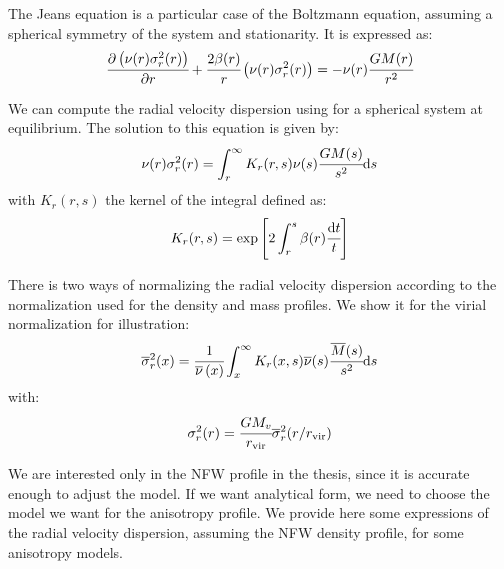 The Jeans equation is a particular case of the Boltzmann equation, assuming a
spherical symmetry of the system and stationarity. It is expressed as:
%
\begin{equation}
    \label{eq:jeans}
    \cfrac{{\partial} \left(\nu(r)\sigma_r^2(r)\right)}{{\partial} r} + \cfrac{2\beta(r)}{r}\left(\nu(r)\sigma_r^2(r)\right)=
    -\nu(r)\cfrac{GM(r)}{r^2}
\end{equation}

We can compute the radial velocity dispersion using  for
a spherical system at equilibrium. The solution to this equation is given by:
%
\begin{equation}
    \nu(r)\sigma_r^2(r)=\int_r^\infty K_r(r,s)\nu(s)\cfrac{GM(s)}{s^2}{\rm{d}}{s}
\end{equation}
%
with $K_r(r,s)$ the kernel of the integral defined as:
%
\begin{equation}
    K_r(r,s)=\exp\left[2\int_r^s\beta(r)\cfrac{{\rm{d}}{t}}{t}\right]
\end{equation}

There is two ways of normalizing the radial velocity dispersion according to
the normalization used for the density and mass profiles. We show it for the
virial normalization for illustration:
%
\begin{equation}
    \label{eq:sigma_norm}
    \overline\sigma_r^2(x)= \cfrac{1}{\overline\nu \left(x\right)}
    \int_x^\infty K_r(x,s)\overline\nu(s)\cfrac{\overline{M}(s)}{s^2}{\rm{d}} s
\end{equation}
%
with:
%
\begin{equation}
    \sigma_r^2(r) = \cfrac{GM_v}{r_{\rm vir}}\overline\sigma_r^2(r/r_{\rm vir})
\end{equation}

We are interested only in the NFW profile in the thesis, since it is accurate
enough to adjust the model. If we want analytical form, we need to choose the
model we want for the anisotropy profile. We provide here some expressions of
the radial velocity dispersion, assuming the NFW density profile, for some
anisotropy models.

\subsection{\citet{ML+05}}
\label{sub:ml05}

